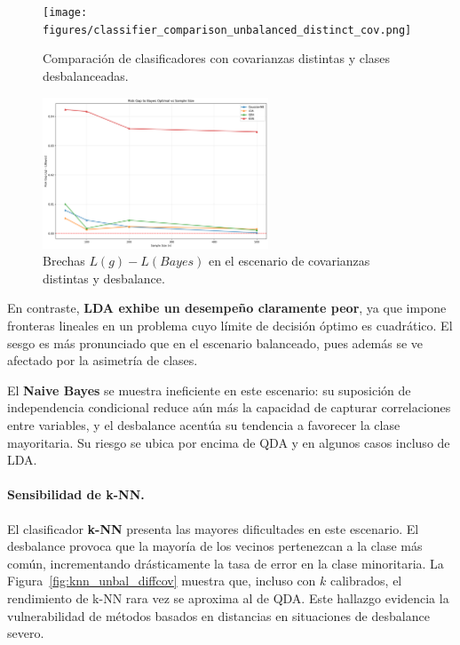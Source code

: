 \documentclass[10pt]{article}
\begin{document}
\begin{figure}[H]
    \centering
    \texttt{[image: figures/classifier\_comparison\_unbalanced\_distinct\_cov.png]}
    \caption{Comparación de clasificadores con covarianzas distintas y clases desbalanceadas.}
    \label{fig:risk_unbal_diffcov}
\end{figure}

\begin{figure}[H]
    \centering
    \includegraphics[width=0.60\textwidth]{figures/risk_gaps.png}
    \caption{Brechas $L(g)-L(Bayes)$ en el escenario de covarianzas distintas y desbalance.}
    \label{fig:riskgap_unbal_diffcov}
\end{figure}

En contraste, \textbf{LDA exhibe un desempeño claramente peor}, ya que impone fronteras lineales en un problema 
cuyo límite de decisión óptimo es cuadrático. El sesgo es más pronunciado que en el escenario balanceado, 
pues además se ve afectado por la asimetría de clases.

El \textbf{Naive Bayes} se muestra ineficiente en este escenario: su suposición de independencia condicional reduce aún más 
la capacidad de capturar correlaciones entre variables, y el desbalance acentúa su tendencia a favorecer la clase mayoritaria. 
Su riesgo se ubica por encima de QDA y en algunos casos incluso de LDA.

\paragraph{Sensibilidad de k-NN.}
El clasificador \textbf{k-NN} presenta las mayores dificultades en este escenario. 
El desbalance provoca que la mayoría de los vecinos pertenezcan a la clase más común, 
incrementando drásticamente la tasa de error en la clase minoritaria. 
La Figura~\ref{fig:knn_unbal_diffcov} muestra que, incluso con $k$ calibrados, el rendimiento de k-NN rara vez se aproxima al de QDA. 
Este hallazgo evidencia la vulnerabilidad de métodos basados en distancias en situaciones de desbalance severo.
\end{document}
